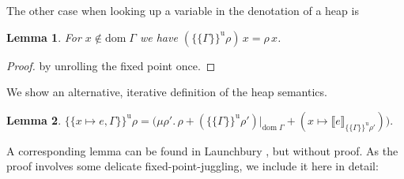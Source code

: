 \documentclass{jfp1}
\newtheorem{lemma}{Lemma}
\theoremstyle{nonumberbreak}
\newtheorem{proof}{Proof}
\newcommand{\dom}[1]{\text{dom}\;#1}
\newcommand{\dsem}[2]{\llbracket #1 \rrbracket_{#2}}
\newcommand{\esemu}[1]{\{\!\!\!\{#1\}\!\!\!\}^{\text{u}}}
\begin{document}
The other case when looking up a variable in the denotation of a heap is

\begin{lemma}
\label{lem:esemu_other}
For $x \notin \dom\Gamma$ we have $(\esemu{\Gamma}\rho)\,x = \rho\, x$.
\end{lemma}

\begin{proof}
by unrolling the fixed point once.
\end{proof}

We show an alternative, iterative definition of the heap semantics.

\begin{lemma}
$
\esemu{x \mapsto e, \Gamma}\rho = \big(\mu \rho'.\,  \rho + (\esemu{\Gamma}{\rho'})|_{\dom\Gamma} + (x \mapsto \dsem{e}{\esemu{\Gamma}\rho'})\big).
$
\label{lem:iter}
\end{lemma}

A corresponding lemma can be found in Launchbury , but without proof. As the proof involves some delicate fixed-point-juggling, we include it here in detail:
\end{document}
